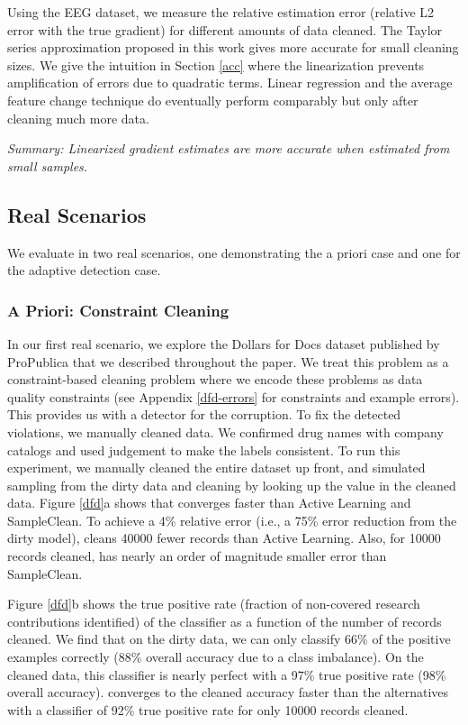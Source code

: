 Using the EEG dataset, we measure the relative estimation error (relative L2 error with the true gradient) for different amounts of data cleaned.
The Taylor series approximation proposed in this work gives more accurate for small cleaning sizes.
We give the intuition in Section \ref{acc} where the linearization prevents amplification of errors due to quadratic terms.
Linear regression and the average feature change technique do eventually perform comparably but only after cleaning much more data.

\vspace{0.25em}

\noindent \emph{Summary: Linearized gradient estimates are more accurate when estimated from small samples. }

\subsection{Real Scenarios}
We evaluate \sys in two real scenarios, one demonstrating the a priori case and one for the adaptive detection case.

\subsubsection{A Priori: Constraint Cleaning}\label{dfd-exp}
In our first real scenario, we explore the Dollars for Docs dataset published by ProPublica that we described throughout the paper.
We treat this problem as a constraint-based cleaning problem where we encode these problems as data quality constraints (see Appendix \ref{dfd-errors} for constraints and example errors). 
This provides us with a detector for the corruption. 
To fix the detected violations, we manually cleaned data.
We confirmed drug names with company catalogs and used judgement to make the labels consistent.
To run this experiment, we manually cleaned the entire dataset up front, and simulated sampling from the dirty data and cleaning by looking up the value in the cleaned data.
Figure \ref{dfd}a shows that \sys converges faster than Active Learning and SampleClean.
To achieve a 4\% relative error (i.e., a 75\% error reduction from the dirty model), \sys cleans 40000 fewer records than Active Learning.
Also, for 10000 records cleaned, \sys has nearly an order of magnitude smaller error than SampleClean.

Figure \ref{dfd}b shows the true positive rate (fraction of non-covered research contributions identified) of the classifier as a function of the number of records cleaned. 
We find that on the dirty data, we can only classify 66\% of the positive examples correctly (88\% overall accuracy due to a class imbalance).
On the cleaned data, this classifier is nearly perfect with a 97\% true positive rate (98\% overall accuracy).
\sys converges to the cleaned accuracy faster than the alternatives with a classifier of 92\% true positive rate for only 10000 records cleaned.

